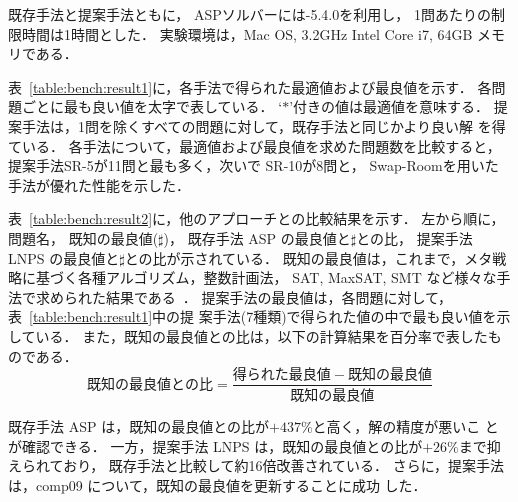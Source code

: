 既存手法と提案手法ともに，
ASPソルバーには{\clingo}-5.4.0を利用し，
1問あたりの制限時間は1時間とした．
実験環境は，Mac OS, 3.2GHz Intel Core i7, 64GB メモリである．

表~\ref{table:bench:result1}に，各手法で得られた最適値および最良値を示す．
各問題ごとに最も良い値を太字で表している．
`$\ast$'付きの値は最適値を意味する．
提案手法は，1問を除くすべての問題に対して，既存手法と同じかより良い解
を得ている．
各手法について，最適値および最良値を求めた問題数を比較すると，
提案手法\textsf{SR-5}が11問と最も多く，次いで
\textsf{SR-10}が8問と，
\textsf{Swap-Room}を用いた手法が優れた性能を示した．


表~\ref{table:bench:result2}に，他のアプローチとの比較結果を示す．
左から順に，
問題名，
既知の最良値($\sharp$)，
既存手法 ASP の最良値と$\sharp$との比，
提案手法 LNPS の最良値と$\sharp$との比が示されている．
既知の最良値は，これまで，メタ戦略に基づく各種アルゴリズム，整数計画法，
SAT, MaxSAT, SMT など様々な手法で求められた結果である~\cite{anor/Banbara2019}．
提案手法の最良値は，各問題に対して，表~\ref{table:bench:result1}中の提
案手法(7種類)で得られた値の中で最も良い値を示している．
また，既知の最良値との比は，以下の計算結果を百分率で表したものである．
\[
既知の最良値との比 = \frac{得られた最良値 - 既知の最良値}{既知の最良値}
\]

既存手法 ASP は，既知の最良値との比が$+437\%$と高く，解の精度が悪いこ
とが確認できる．
一方，提案手法 LNPS は，既知の最良値との比が$+26\%$まで抑えられており，
既存手法と比較して約16倍改善されている．
さらに，提案手法は，comp09 について，既知の最良値を更新することに成功
した．

